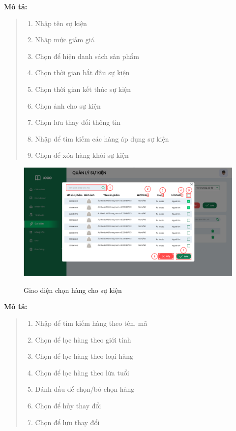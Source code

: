             \textbf{Mô tả:}  
            \begin{quote}
                \begin{enumerate}
                    \item Nhập tên sự kiện
                    \item Nhập mức giảm giá
                    \item Chọn để hiện danh sách sản phẩm
                    \item Chọn thời gian bắt đầu sự kiện
                    \item Chọn thời gian kết thúc sự kiện
                    \item Chọn ảnh cho sự kiện
                    \item Chọn lưu thay đổi thông tin
                    \item Nhập để tìm kiếm các hàng áp dụng sự kiện
                    \item Chọn để xóa hàng khỏi sự kiện
                \end{enumerate}
            \end{quote}
        
        \newpage

            \begin{figure}[!htp]
                \centering
                \includegraphics[width=12cm]{img/UI/admin/Event_select.png}
                \label{36}
                \newline
                \caption{Giao diện chọn hàng cho sự kiện}
            \end{figure}
            \textbf{Mô tả:}  
            \begin{quote}
                \begin{enumerate}
                    \item Nhập để tìm kiếm hàng theo tên, mã
                    \item Chọn để lọc hàng theo giới tính
                    \item Chọn để lọc hàng theo loại hàng
                    \item Chọn để lọc hàng theo lứa tuổi
                    \item Đánh dấu để chọn/bỏ chọn hàng
                    \item Chọn để hủy thay đổi
                    \item Chọn để lưu thay đổi
                \end{enumerate}
            \end{quote}
    
